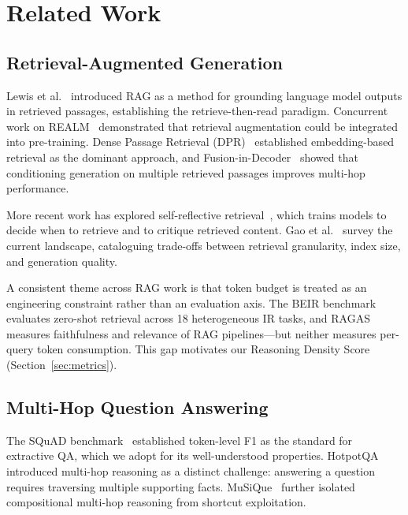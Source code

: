 \section{Related Work}\label{sec:related-work}

\subsection{Retrieval-Augmented Generation}\label{sec:rw-rag}

Lewis et al.~\cite{lewis2020rag} introduced RAG as a method for grounding
language model outputs in retrieved passages, establishing the retrieve-then-read
paradigm. Concurrent work on REALM~\cite{guu2020realm} demonstrated that
retrieval augmentation could be integrated into pre-training. Dense Passage
Retrieval (DPR)~\cite{karpukhin2020dpr} established embedding-based retrieval
as the dominant approach, and Fusion-in-Decoder~\cite{izacard2021leveraging}
showed that conditioning generation on multiple retrieved passages improves
multi-hop performance.

More recent work has explored self-reflective
retrieval~\cite{asai2023selfrag}, which trains models to decide when to
retrieve and to critique retrieved content. Gao et al.~\cite{gao2024ragsurvey}
survey the current landscape, cataloguing trade-offs between retrieval
granularity, index size, and generation quality.

A consistent theme across RAG work is that token budget is treated as an
engineering constraint rather than an evaluation axis. The BEIR
benchmark~\cite{thakur2021beir} evaluates zero-shot retrieval across 18
heterogeneous IR tasks, and RAGAS~\cite{es2023ragas} measures faithfulness and
relevance of RAG pipelines---but neither measures per-query token consumption.
This gap motivates our Reasoning Density Score (Section~\ref{sec:metrics}).

\subsection{Multi-Hop Question Answering}\label{sec:rw-multihop}

The SQuAD benchmark~\cite{rajpurkar2016squad} established token-level F1 as
the standard for extractive QA, which we adopt for its well-understood
properties. HotpotQA~\cite{yang2018hotpotqa} introduced multi-hop reasoning
as a distinct challenge: answering a question requires traversing multiple
supporting facts. MuSiQue~\cite{trivedi2022musique} further isolated
compositional multi-hop reasoning from shortcut exploitation.

